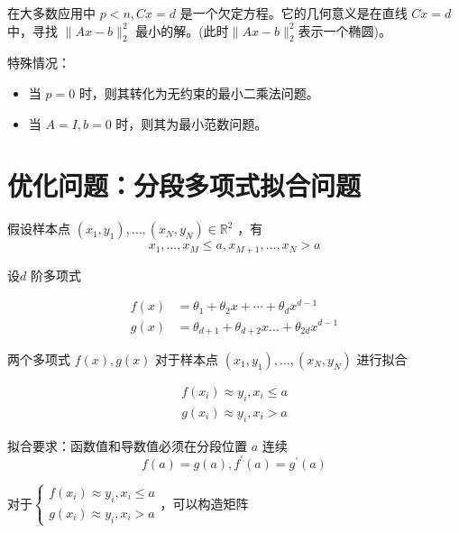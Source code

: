 
在大多数应用中 $ p<n, C x=d $ 是一个欠定方程。它的几何意义是在直线 $ C x=d $ 中，寻找 $ \|A x-b\|_{2}^{2} $ 最小的解。(此时$\|A x-b\|_{2}^{2}$表示一个椭圆)。

特殊情况：

\begin{itemize}
    \item 当 $ {p}=0 $ 时，则其转化为无约束的最小二乘法问题。
    \item 当 $ {A}=I, b=0 $ 时，则其为最小范数问题。
\end{itemize}




\section{优化问题：分段多项式拟合问题}

\begin{problem}
    假设样本点 $ \left(x_{1}, y_{1}\right), \ldots,\left(x_{N}, y_{N}\right) \in \mathbb{R}^{2} $ ，有 $$ x_{1}, \ldots, x_{M} \leq a , x_{M+1}, \ldots, x_{N}>a$$

    设$ {d} $ 阶多项式 

    $$
    \begin{aligned}
        f(x)&=\theta_{1}+\theta_{2} x+\cdots+\theta_{d} x^{d-1}\\
        g(x)&=\theta_{d+1}+\theta_{d+2} x \ldots+\theta_{2 d} x^{d-1}
    \end{aligned}
    $$

    两个多项式 $ f(x), g(x) $ 对于样本点 $ \left(x_{1}, y_{1}\right), \ldots,\left(x_{N}, y_{N}\right) $ 进行拟合

    $$
    \begin{array}{l}
    f\left(x_{i}\right) \approx y_{i}, x_{i} \leq a \\
    g\left(x_{i}\right) \approx y_{i}, x_{i}>a
    \end{array}
    $$

    拟合要求：函数值和导数值必须在分段位置 $ a $ 连续
    $$
    f(a)=g(a), f^{\prime}(a)=g^{\prime}(a)
    $$
\end{problem}

对于$
\left\{
    \begin{array}{l}
f\left(x_{i}\right) \approx y_{i}, x_{i} \leq a \\
g\left(x_{i}\right) \approx y_{i}, x_{i}>a
\end{array}
\right.
$，可以构造矩阵

